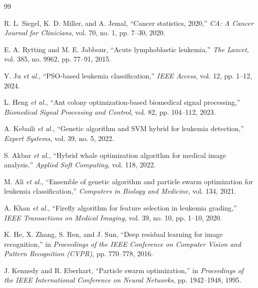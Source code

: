 \documentclass[12pt,a4paper]{article}
\begin{document}
\begin{thebibliography}{99}

R. L. Siegel, K. D. Miller, and A. Jemal,
``Cancer statistics, 2020,''
\textit{CA: A Cancer Journal for Clinicians},
vol. 70, no. 1, pp. 7--30, 2020.

E. A. Rytting and M. E. Jabbour,
``Acute lymphoblastic leukemia,''
\textit{The Lancet},
vol. 385, no. 9962, pp. 77--91, 2015.

Y. Ju \textit{et al.},
``PSO-based leukemia classification,''
\textit{IEEE Access},
vol. 12, pp. 1--12, 2024.

L. Heng \textit{et al.},
``Ant colony optimization-based biomedical signal processing,''
\textit{Biomedical Signal Processing and Control},
vol. 82, pp. 104--112, 2023.

A. Kebaili \textit{et al.},
``Genetic algorithm and SVM hybrid for leukemia detection,''
\textit{Expert Systems},
vol. 39, no. 5, 2022.

S. Akbar \textit{et al.},
``Hybrid whale optimization algorithm for medical image analysis,''
\textit{Applied Soft Computing},
vol. 118, 2022.

M. Ali \textit{et al.},
``Ensemble of genetic algorithm and particle swarm optimization for leukemia classification,''
\textit{Computers in Biology and Medicine},
vol. 134, 2021.

A. Khan \textit{et al.},
``Firefly algorithm for feature selection in leukemia grading,''
\textit{IEEE Transactions on Medical Imaging},
vol. 39, no. 10, pp. 1--10, 2020.

K. He, X. Zhang, S. Ren, and J. Sun,
``Deep residual learning for image recognition,''
in \textit{Proceedings of the IEEE Conference on Computer Vision and Pattern Recognition (CVPR)},
pp. 770--778, 2016.

J. Kennedy and R. Eberhart,
``Particle swarm optimization,''
in \textit{Proceedings of the IEEE International Conference on Neural Networks},
pp. 1942--1948, 1995.

\end{thebibliography}
\end{document}
